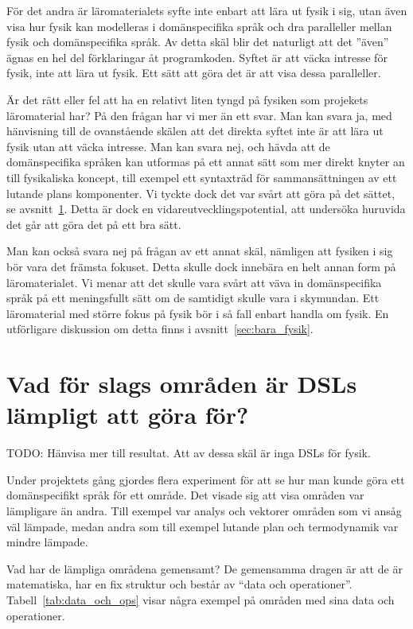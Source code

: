 \begin{binge}
För det andra är läromaterialets syfte inte enbart att lära ut fysik i sig, utan även visa hur fysik kan modelleras i domänspecifika språk och dra paralleller mellan fysik och domänspecifika språk. Av detta skäl blir det naturligt att det ''även'' ägnas en hel del förklaringar åt programkoden. Syftet är att väcka intresse för fysik, inte att lära ut fysik. Ett sätt att göra det är att visa dessa paralleller.

Är det rätt eller fel att ha en relativt liten tyngd på fysiken som projekets läromaterial har? På den frågan har vi mer än ett svar. Man kan svara ja, med hänvisning till de ovanstående skälen att det direkta syftet inte är att lära ut fysik utan att väcka intresse. Man kan svara nej, och hävda att de domänspecifika språken kan utformas på ett annat sätt som mer direkt knyter an till fysikaliska koncept, till exempel ett syntaxträd för sammansättningen av ett lutande plans komponenter. Vi tyckte dock det var svårt att göra på det sättet, se avsnitt~\ref{sec:lampligt}. Detta är dock en vidareutvecklingspotential, att undersöka huruvida det går att göra det på ett bra sätt.

Man kan också svara nej på frågan av ett annat skäl, nämligen att fysiken i sig bör vara det främsta fokuset. Detta skulle dock innebära en helt annan form på läromaterialet. Vi menar att det skulle vara svårt att väva in domänspecifika språk på ett meningsfullt sätt om de samtidigt skulle vara i skymundan. Ett läromaterial med större fokus på fysik bör i så fall enbart handla om fysik. En utförligare diskussion om detta finns i avsnitt~\ref{sec:bara_fysik}.

\section{Vad för slags områden är DSLs lämpligt att göra för?}
\label{sec:lampligt}

TODO: Hänvisa mer till resultat. Att av dessa skäl är inga DSLs för fysik.

Under projektets gång gjordes flera experiment för att se hur man kunde göra ett domänspecifikt språk för ett område. Det visade sig att visa områden var lämpligare än andra. Till exempel var analys och vektorer områden som vi ansåg väl lämpade, medan andra som till exempel lutande plan och termodynamik var mindre lämpade.

Vad har de lämpliga områdena gemensamt? De gemensamma dragen är att de är
matematiska, har en fix struktur och består av ``data och operationer''.
Tabell~\ref{tab:data_och_ops} visar några exempel på områden med sina data och
operationer.


\end{binge}
